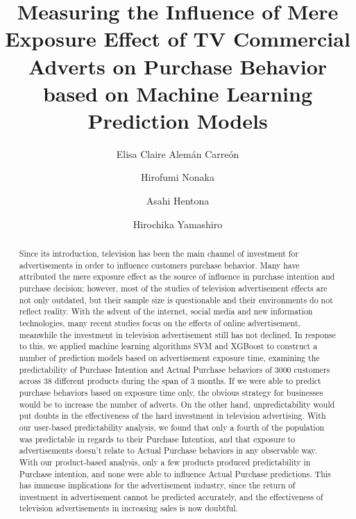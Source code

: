\documentclass[review]{elsarticle}
\begin{document}
\begin{frontmatter}

\title{Measuring the Influence of Mere Exposure Effect of TV Commercial Adverts on Purchase Behavior based on Machine Learning Prediction Models}

\author[gidai]{Elisa Claire Alemán Carreón
}

\author[gidai]{Hirofumi Nonaka}

\author[gidai]{Asahi Hentona}

\author[gidai]{Hirochika Yamashiro}

\address[gidai]{Nagaoka University of Technology, Nagaoka, Japan}




\begin{abstract}
Since its introduction, television has been the main channel of investment for advertisements in order to influence customers purchase behavior. Many have attributed the mere exposure effect as the source of influence in purchase intention and purchase decision; however, most of the studies of television advertisement effects are not only outdated, but their sample size is questionable and their environments do not reflect reality. With the advent of the internet, social media and new information technologies, many recent studies focus on the effects of online advertisement, meanwhile the investment in television advertisement still has not declined. In response to this, we applied machine learning algorithms SVM and XGBoost to construct a number of prediction models based on advertisement exposure time, examining the predictability of Purchase Intention and Actual Purchase behaviors of 3000 customers across 38 different products during the span of 3 months. If we were able to predict purchase behaviors based on exposure time only, the obvious strategy for businesses would be to increase the number of adverts. On the other hand, unpredictability would put doubts in the effectiveness of the hard investment in television advertising. With our user-based predictability analysis, we found that only a fourth of the population was predictable in regards to their Purchase Intention, and that exposure to advertisements doesn't relate to Actual Purchase behaviors in any observable way. With our product-based analysis, only a few products produced predictability in Purchase intention, and none were able to influence Actual Purchase predictions. This has immense implications for the advertisement industry, since the return of investment in advertisement cannot be predicted accurately, and the effectiveness of television advertisements in increasing sales is now doubtful.



\end{abstract}
\end{frontmatter}
\end{document}
